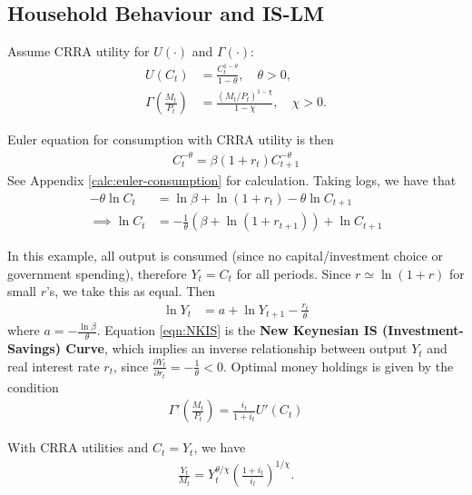 \documentclass{article}
\newcommand{\?}{\textcolor{red}{(?)}} %
\begin{document}
    
    \subsection{Household Behaviour and IS-LM}
        
        Assume CRRA utility for $U(\cdot)$ and $\Gamma(\cdot)$:
        \begin{align}
            U(C_t)
            &= \frac{C_t^{1-\theta}}{1-\theta},
            \quad \theta > 0,\\
            \Gamma\left(\frac{M_t}{P_t}\right)
            &= \frac{(M_t/P_t)^{1-\chi}}{1-\chi},
            \quad \chi > 0.
        \end{align}
        
        Euler equation for consumption with CRRA utility is then
        \begin{align}
            C_t^{-\theta} = \beta (1+r_t) C_{t+1}^{-\theta}
            \label{eqn:euler-consumption}
        \end{align}
        See Appendix \eqref{calc:euler-consumption} for calculation.
        Taking logs, we have that
        \begin{align}
            -\theta \ln C_t &= \ln \beta +  \ln(1 + r_t) - \theta \ln C_{t+1} \\
            \implies
            \ln C_t &= -\frac{1}{\theta}\left(\beta + \ln(1+r_{t+1})\right) + \ln C_{t+1}
        \end{align}
        
        In this example, all output is consumed (since no capital/investment choice or government spending), therefore $Y_t = C_t$ for all periods. Since $r \simeq \ln(1+r)$ for small $r$'s, we take this as equal. Then
        \begin{align}
            \ln Y_t &= a + \ln Y_{t+1} - \frac{r_t}{\theta}
            \label{eqn:NKIS}
        \end{align}
        where $a = -\frac{\ln \beta}{\theta}$. Equation \eqref{eqn:NKIS} is the \textbf{New Keynesian IS (Investment-Savings) Curve}, which implies an inverse relationship between output $Y_t$ and real interest rate $r_t$, since $\frac{\partial Y_t}{\partial r_t} = -\frac{1}{\theta} < 0$. Optimal money holdings is given by the condition
        \begin{align}
            \Gamma'\left(\frac{M_t}{P_t}\right)
            = \frac{i_t}{1+i_t}U'(C_t)
        \end{align}
        
        With CRRA utilities and $C_t = Y_t$, we have
        \begin{align}
            \frac{Y_t}{M_t} = Y_t^{\theta/\chi} \left(\frac{1+i_t}{i_t}\right)^{1/\chi}.
            \label{eqn:optimal-money-holdings}
        \end{align}
        
\end{document}
